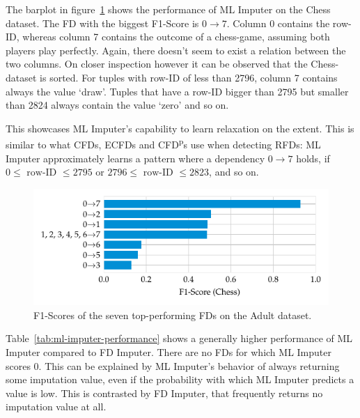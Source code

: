 The barplot in figure~\ref{fig:f1-ml-imputer-chess} shows the performance of ML Imputer on the Chess dataset.
The FD with the biggest F1-Score is \( 0 \rightarrow 7 \).
Column 0 contains the row-ID, whereas column 7 contains the outcome of a chess-game, assuming both players play perfectly.
Again, there doesn't seem to exist a relation between the two columns.
On closer inspection however it can be observed that the Chess-dataset is sorted.
For tuples with row-ID of less than 2796, column 7 contains always the value `draw'.
Tuples that have a row-ID bigger than 2795 but smaller than 2824 always contain the value `zero' and so on.

This showcases ML Imputer's capability to learn relaxation on the extent.
This is similar to what CFDs, ECFDs and CFD\textsuperscript{p}s use when detecting RFDs:
ML Imputer approximately learns a pattern where a dependency \( 0 \rightarrow 7\) holds, if \( 0 \leq \text{ row-ID } \leq 2795 \) or \( 2796 \leq \text{ row-ID } \leq 2823 \), and so on.

\begin{figure}[ht]
     \centering
     \includegraphics[width=\textwidth]{../figures/chess/f1_ml_imputer.pdf}
     \caption{F1-Scores of the seven top-performing FDs on the Adult dataset.}
     \label{fig:f1-ml-imputer-chess}
 \end{figure}

Table~\ref{tab:ml-imputer-performance} shows a generally higher performance of ML Imputer compared to FD Imputer.
There are no FDs for which ML Imputer scores 0.
This can be explained by ML Imputer's behavior of always returning some imputation value, even if the probability with which ML Imputer predicts a value is low.
This is contrasted by FD Imputer, that frequently returns no imputation value at all.

